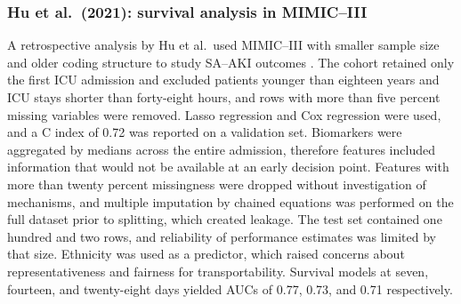 \subsubsection{Hu et al.\ (2021): survival analysis in MIMIC--III}
A retrospective analysis by Hu et al.\ used MIMIC--III with smaller sample size and older coding structure to study SA--AKI outcomes \citep{Hu_2021}. The cohort retained only the first ICU admission and excluded patients younger than eighteen years and ICU stays shorter than forty-eight hours, and rows with more than five percent missing variables were removed. Lasso regression and Cox regression were used, and a C index of 0.72 was reported on a validation set. Biomarkers were aggregated by medians across the entire admission, therefore features included information that would not be available at an early decision point. Features with more than twenty percent missingness were dropped without investigation of mechanisms, and multiple imputation by chained equations was performed on the full dataset prior to splitting, which created leakage. The test set contained one hundred and two rows, and reliability of performance estimates was limited by that size. Ethnicity was used as a predictor, which raised concerns about representativeness and fairness for transportability. Survival models at seven, fourteen, and twenty-eight days yielded AUCs of 0.77, 0.73, and 0.71 respectively.

